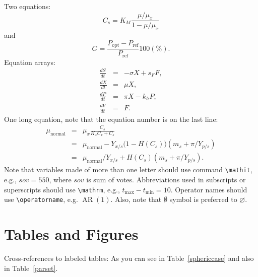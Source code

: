 \documentclass[ecta,nameyear,final,supplement]{econsocart}
\theoremstyle{plain}
\theoremstyle{definition}
\begin{document}
Two equations:
\begin{equation}
    C_{s}  =  K_{M} \frac{\mu/\mu_{x}}{1-\mu/\mu_{x}} \label{ccs}
\end{equation}
and
\begin{equation}
    G = \frac{P_{\mathrm{opt}} - P_{\mathrm{ref}}}{P_{\mathrm{ref}}}  100(\%).
\end{equation}
Equation arrays:
\begin{eqnarray}
  \frac{dS}{dt} & = & - \sigma X + s_{F} F,\\
  \frac{dX}{dt} & = &   \mu    X,\\
  \frac{dP}{dt} & = &   \pi    X - k_{h} P,\\
  \frac{dV}{dt} & = &   F.
\end{eqnarray}
One long equation, note that the equation number is on the last line:
\begin{eqnarray}
 \mu_{\text{normal}} & = & \mu_{x} \frac{C_{s}}{K_{x}C_{x}+C_{s}}  \nonumber\\
                     & = & \mu_{\text{normal}} - Y_{x/s}\bigl(1-H(C_{s})\bigr)(m_{s}+\pi /Y_{p/s})\nonumber\\
                     & = & \mu_{\text{normal}}/Y_{x/s}+ H(C_{s}) (m_{s}+ \pi /Y_{p/s}).\label{e7}
\end{eqnarray}
Note that variables made of more than one letter should use command \verb|\mathit|,
e.g., $\mathit{sov}=550$, where $\mathit{sov}$ is sum of votes. Abbreviations used in subscripts or superscripts should use \verb|\mathrm|,
e.g., $t_{\mathrm{max}}-t_{\mathrm{min}} =10$. Operator names should use \verb|\operatorname|, e.g. $\operatorname{AR}(1)$. Also, note that $\emptyset$ symbol is preferred to $\varnothing$.

\section{Tables and Figures}
Cross-references to labeled tables: As you can see in Table~\ref{sphericcase}
and also in Table~\ref{parset}.
\end{document}
